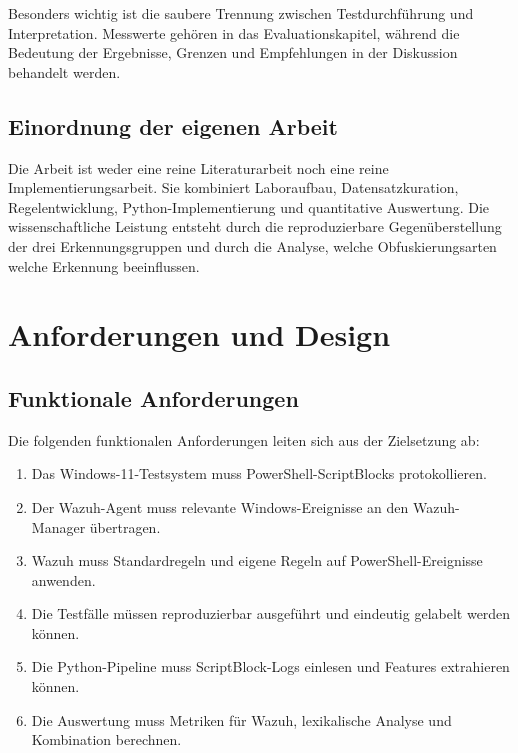 \documentclass[12pt,a4paper,oneside,parskip=half]{scrreprt}
\begin{document}
Besonders wichtig ist die saubere Trennung zwischen Testdurchführung und Interpretation. Messwerte gehören in das Evaluationskapitel, während die Bedeutung der Ergebnisse, Grenzen und Empfehlungen in der Diskussion behandelt werden.

\section{Einordnung der eigenen Arbeit}
Die Arbeit ist weder eine reine Literaturarbeit noch eine reine Implementierungsarbeit. Sie kombiniert Laboraufbau, Datensatzkuration, Regelentwicklung, Python-Implementierung und quantitative Auswertung. Die wissenschaftliche Leistung entsteht durch die reproduzierbare Gegenüberstellung der drei Erkennungsgruppen und durch die Analyse, welche Obfuskierungsarten welche Erkennung beeinflussen.

\chapter{Anforderungen und Design}

\section{Funktionale Anforderungen}
Die folgenden funktionalen Anforderungen leiten sich aus der Zielsetzung ab:
\begin{enumerate}[label=FA\arabic*]
    \item Das Windows-11-Testsystem muss PowerShell-ScriptBlocks protokollieren.
    \item Der Wazuh-Agent muss relevante Windows-Ereignisse an den Wazuh-Manager übertragen.
    \item Wazuh muss Standardregeln und eigene Regeln auf PowerShell-Ereignisse anwenden.
    \item Die Testfälle müssen reproduzierbar ausgeführt und eindeutig gelabelt werden können.
    \item Die Python-Pipeline muss ScriptBlock-Logs einlesen und Features extrahieren können.
    \item Die Auswertung muss Metriken für Wazuh, lexikalische Analyse und Kombination berechnen.
\end{enumerate}
\end{document}
